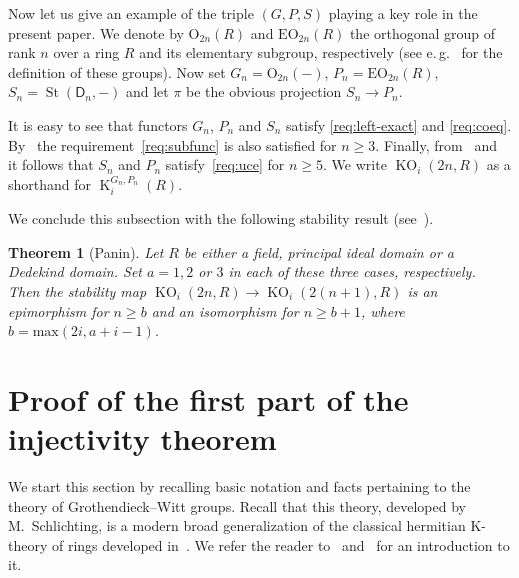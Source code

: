 \documentclass[oneside, 8pt]{amsart}
\newtheorem{externaltheorem}[lemma]{Theorem}
\theoremstyle{remark}
\theoremstyle{definition}
\numberwithin{lemma}{section}
\numberwithin{prop}{section}
\numberwithin{corollary}{section}
\numberwithin{externaltheorem}{section}
\DeclareMathOperator{\St}{St}
\DeclareMathOperator{\K}{K}
\DeclareMathOperator{\KO}{KO}
\newcommand{\rD}{\mathsf{D}}
\numberwithin{equation}{section}
\begin{document}
Now let us give an example of the triple $(G, P, S)$ playing a key role in the present paper.
We denote by $\mathrm{O}_{2n}(R)$ and $\mathrm{EO}_{2n}(R)$ the orthogonal group of rank $n$ over a ring $R$ and its elementary subgroup, respectively
 (see e.\,g.~\cite{Su82} for the definition of these groups).
Now set $G_n = \mathrm{O}_{2n}(-)$, $P_n = \mathrm{EO}_{2n}(R)$, $S_n = \St(\rD_n, -)$ and let $\pi$ be the obvious projection $S_n \to P_n$.

It is easy to see that functors $G_n$, $P_n$ and $S_n$ satisfy \ref{req:left-exact} and \ref{req:coeq}.
By~\cite{Su82} the requirement~\ref{req:subfunc} is also satisfied for $n \geq 3$.
Finally, from~\cite[Corollary~5.4]{St71} and~\cite[Theorem~1]{LS17} it follows that $S_n$ and $P_n$ satisfy~\ref{req:uce} for $n \geq 5$.
We write $\KO_i(2n, R)$ as a shorthand for $\K_i^{G_n, P_n}(R)$.

\begin{comment}
In the above definition we could have replaced the group $\mathrm{O}_{2n}$ with a different isogeneous form of the orthogonal group, e.\,g. 
 we could have chosen $G_n = \mathrm{SO}_{2n}$ or $G_n = \mathrm{Spin}_{2n}$ and then have defined $P_n$ as its elementary subfunctor.
Of course, this would change the functors $\K_i(G_n, P_n, -)$ for $i=1,2$ however, as the proof of~\cref{characterization} suggests
 it would not change $\K_3(G_n, P_n, -)$.
\end{comment}

We conclude this subsection with the following stability result (see~\cite[Theorem~9.4]{Pa89}).
\begin{externaltheorem}[Panin] \label{Panin-stability}
 Let $R$ be either a field, principal ideal domain or a Dedekind domain. Set $a = 1,2$ or $3$ in each of these three cases, respectively.
 Then the stability map $\KO_i(2n, R) \to \KO_i(2(n+1), R)$ is an epimorphism for $n \geq b$ 
 and an isomorphism for $n \geq b + 1$, where $b = \mathrm{max}(2i, a+i-1)$. \end{externaltheorem}

\section{Proof of the first part of the injectivity theorem} \label{firstPart}
We start this section by recalling basic notation and facts pertaining to the theory of Grothendieck--Witt groups.
Recall that this theory, developed by M.~Schlichting, is a modern broad generalization of the classical hermitian K-theory of rings developed in~\cite{Ka80}. We refer the reader to~\cite[\S~2]{FRS12} and~\cite[\S~2]{AF17} for an introduction to it.
\end{document}
